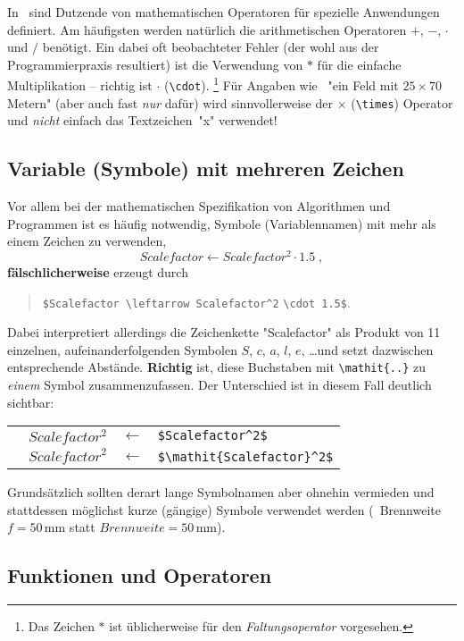In \latex\ sind Dutzende von mathematischen Operatoren für spezielle
Anwendungen definiert. Am häufigsten werden natürlich die arithmetischen
Operatoren $+$, $-$, $\cdot$ und $/$ benötigt. Ein dabei oft beobachteter
Fehler (der wohl aus der Programmierpraxis resultiert) ist die Verwendung von
$*$ für die einfache Multiplikation -- richtig ist $\cdot$ (\verb!\cdot!).%
\footnote{Das Zeichen $*$ ist üblicherweise für den \emph{Faltungsoperator}
vorgesehen.}
%
Für Angaben wie \zB\ "ein Feld mit $25 \times 70$ Metern" (aber auch fast
\emph{nur} dafür) wird sinnvollerweise der $\times$ (\verb!\times!) Operator
und \emph{nicht} einfach das Textzeichen~"x" verwendet!


\subsection{Variable (Symbole) mit mehreren Zeichen}

Vor allem bei der mathematischen Spezifikation von Algorithmen und Programmen
ist es häufig notwendig, Symbole (Variablennamen) mit mehr als einem Zeichen
zu verwenden, \zB
%
	\[Scalefactor\leftarrow Scalefactor^2 \cdot 1.5 \; ,\]
%
\textbf{fälschlicherweise} erzeugt durch
%
\begin{quote}
	\verb!$Scalefactor \leftarrow Scalefactor^2! \verb!\cdot 1.5$!.
\end{quote}
%
Dabei interpretiert \latex allerdings die Zeichenkette "Scalefactor" als 
Produkt von 11 einzelnen, aufeinanderfolgenden Symbolen $S$, $c$, $a$, $l$,
$e$, \ldots und setzt dazwischen entsprechende Abstände. 
\textbf{Richtig} ist, diese Buchstaben mit \verb!\mathit{..}! zu \emph{einem}
Symbol zusammenzufassen. Der Unterschied ist in diesem Fall deutlich sichtbar:
%
\begin{center}
	\setlength{\tabcolsep}{4pt}
	\begin{tabular}{llll}
		\text{Falsch:}  & $Scalefactor^2$          & $\leftarrow$ &
		\verb!$Scalefactor^2$!          \\
		\text{Richtig:} & $\mathit{Scalefactor}^2$ & $\leftarrow$ &
		\verb!$\mathit{Scalefactor}^2$!
	\end{tabular}
\end{center}
%
Grundsätzlich sollten derart lange Symbolnamen aber ohnehin vermieden und
stattdessen möglichst kurze (gängige) Symbole verwendet werden (\zB\
Brennweite $f = 50 \, \mathrm{mm}$ statt $\mathit{Brennweite} = 50 \,
\mathrm{mm}$).

\subsection{Funktionen und Operatoren}


